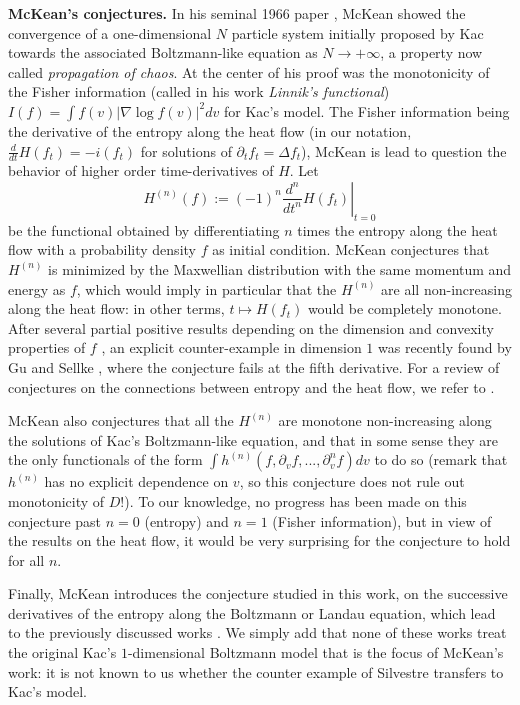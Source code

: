 \documentclass[11pt,a4paper]{article}
\theoremstyle{definition}
\theoremstyle{plain}
\begin{document}
\noindent
\textbf{McKean's conjectures.} In his seminal 1966 paper \cite{McKean1966}, McKean showed the convergence of a one-dimensional $N$ particle system initially proposed by Kac \cite{Kac1956} towards the associated Boltzmann-like equation as $N\rightarrow+\infty$, a property now called \textit{propagation of chaos}. At the center of his proof was the monotonicity of the Fisher information (called  in his work \textit{Linnik's functional}) $
    I(f)=\int f(v) \vert \nabla \log f(v)\vert^2dv$
 for Kac's model. The Fisher information being the derivative of the entropy along the heat flow (in our notation, $\frac{d}{dt}H(f_t)=-i(f_t)$ for solutions of $\partial_t f_t =\Delta f_t$), McKean is lead to question the behavior of higher order time-derivatives of $H$. Let
\begin{equation*}
H^{(n)}(f):=(-1)^n\left.\frac{d^n}{dt^n}H(f_t)\right\vert_{t=0}
\end{equation*}
be the functional obtained by differentiating $n$ times the entropy along the heat flow with a probability density $f$ as initial condition. McKean conjectures that $H^{(n)}$ is minimized by the Maxwellian distribution with the same momentum and energy as $f$, which would imply in particular that the $H^{(n)}$ are all non-increasing along the heat flow: in other terms, $t\mapsto H(f_t)$ would be completely monotone. After several partial positive results depending on the dimension and convexity properties of $f$ \cite{FanChengYanlinGeng2015,Toscani2015,GuoYuanGao2022,ZhangAnantharamGeng2018,Wang2024}, an explicit counter-example in dimension $1$ was recently found by Gu and Sellke \cite{GuSellke2026}, where the conjecture fails at the fifth derivative. For a review of conjectures on the connections between entropy and the heat flow, we refer to \cite{Ledoux2022}.

McKean also conjectures that all the $H^{(n)}$ are monotone non-increasing along the solutions of Kac's Boltzmann-like equation, and that in some sense they are the only functionals of the form
$\int h^{(n)}(f,\partial_vf,...,\partial_v^nf)dv$
to do so (remark that $h^{(n)}$ has no explicit dependence on $v$, so this conjecture does not rule out monotonicity of $D$!). To our knowledge, no progress has been made on this conjecture past $n=0$ (entropy) and $n=1$ (Fisher information), but in view of the results on the heat flow, it would be very surprising for the conjecture to hold for all $n$.

Finally, McKean introduces the conjecture studied in this work, on the successive derivatives of the entropy along the Boltzmann or Landau equation, which lead to the previously discussed works \cite{Harris1967,ZiffMerajverStell1981,Olaussen1982,Lieb1982,Silvestre2026}. We simply add that none of these works treat the original Kac's $1$-dimensional Boltzmann model that is the focus of McKean's work: it is not known to us whether the counter example of Silvestre transfers to Kac's model.
\\
\end{document}
